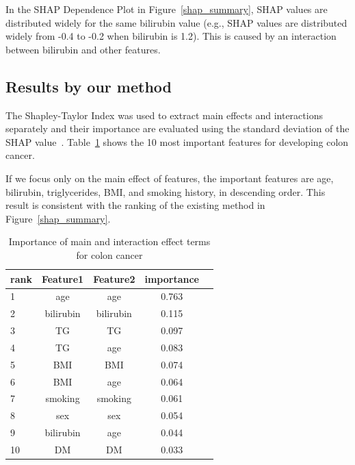 \documentclass[nohyperref]{article}
\theoremstyle{plain}
\theoremstyle{definition}
\theoremstyle{remark}
\begin{document}
In the SHAP Dependence Plot in Figure~\ref{shap_summary}, SHAP values are distributed widely for the same bilirubin value (e.g., SHAP values are distributed widely from -0.4 to -0.2 when bilirubin is 1.2).
This is caused by an interaction between bilirubin and other features.


\subsection{Results by our method}
The Shapley-Taylor Index was used to extract main effects and interactions separately and their importance are evaluated using the standard deviation of the SHAP value~\cite{nohara2022shap}.
Table~\ref{importance_top10} shows the 10 most important features for developing colon cancer.

If we focus only on the main effect of features,  the important features are age, bilirubin, triglycerides, BMI, and smoking history, in descending order.
This result is consistent with the ranking of the existing method in Figure~\ref{shap_summary}.

\begin{table}[t]
\caption{Importance of main and interaction effect terms for colon cancer}
\label{importance_top10}
\vskip 0.15in
\begin{center}
\begin{small}
\begin{sc}
\begin{tabular}{lcccc}
\toprule
rank & Feature1 & Feature2 & importance \\
\midrule
1 & age & age & 0.763 \\
2 & bilirubin & bilirubin & 0.115 \\
3 & TG & TG & 0.097 \\
4 & TG & age & 0.083 \\
5 & BMI & BMI & 0.074 \\
6 & BMI & age & 0.064 \\
7 & smoking & smoking & 0.061 \\
8 & sex & sex & 0.054 \\
9 & bilirubin & age & 0.044 \\
10 & DM & DM & 0.033 \\
\bottomrule
\end{tabular}
\end{sc}
\end{small}
\end{center}
\vskip -0.1in
\end{table}
\end{document}
